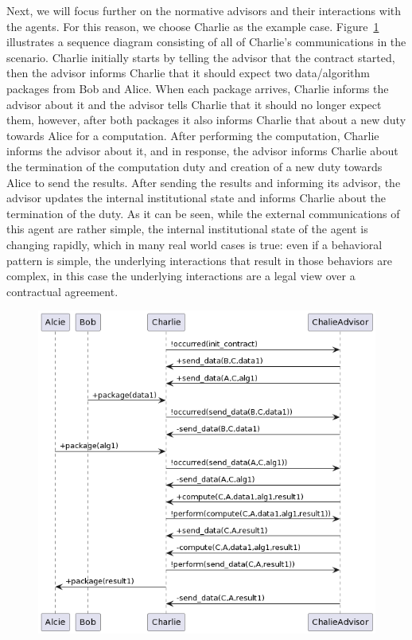 Next, we will focus further on the normative advisors and their interactions with the agents. For this reason, we choose Charlie as the example case. Figure~\ref{fig:dmp-charlie-seq} illustrates a sequence diagram consisting of all of Charlie's communications in the scenario. Charlie initially starts by telling the advisor that the contract started, then the advisor informs Charlie that it should expect two data/algorithm packages from Bob and Alice. When each package arrives, Charlie informs the advisor about it and the advisor tells Charlie that it should no longer expect them, however, after both packages it also informs Charlie that about a new duty towards Alice for a computation. After performing the computation, Charlie informs the advisor about it, and in response, the advisor informs Charlie about the termination of the computation duty and creation of a new duty towards Alice to send the results. After sending the results and informing its advisor, the advisor updates the internal institutional state and informs Charlie about the termination of the duty. As it can be seen, while the external communications of this agent are rather simple, the internal institutional state of the agent is changing rapidly, which in many real world cases is true: even if a behavioral pattern is simple, the underlying interactions that result in those behaviors are complex, in this case the underlying interactions are a legal view over a contractual agreement.

\begin{figure}[!tbh]
\centering
\includegraphics[width=.66\textwidth]{ch_cmf/market-charlie-seq.png}
  \label{fig:dmp-charlie-seq}
\end{figure}

